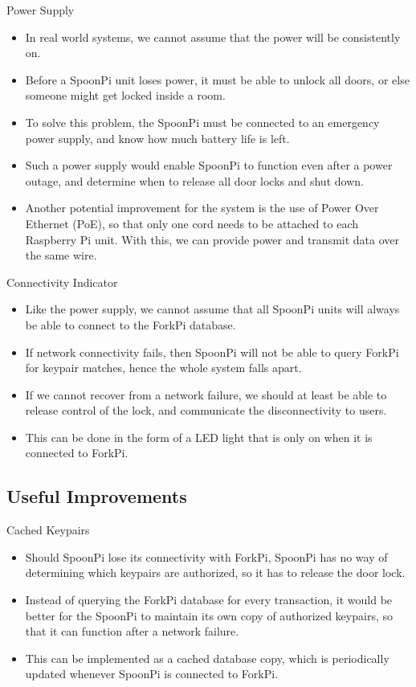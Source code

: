 \begin{frame}{Power Supply}
\begin{itemize}
    \item<1-> In real world systems, we cannot assume that the power will be consistently on.
    \item<2-> Before a SpoonPi unit loses power, it must be able to unlock all doors, or else someone might get locked inside a room.
    \item<3-> To solve this problem, the SpoonPi must be connected to an emergency power supply, and know how much battery life is left.
    \item<4-> Such a power supply would enable SpoonPi to function even after a power outage, and determine when to release all door locks and shut down.
    \item<5-> Another potential improvement for the system is the use of Power Over Ethernet (PoE), so that only one cord needs to be attached to each Raspberry Pi unit. With this, we can provide power and transmit data over the same wire.
\end{itemize}
\end{frame}

\begin{frame}{Connectivity Indicator}
\begin{itemize}
    \item<1-> Like the power supply, we cannot assume that all SpoonPi units will always be able to connect to the ForkPi database.
    \item<2-> If network connectivity fails, then SpoonPi will not be able to query ForkPi for keypair matches, hence the whole system falls apart.
    \item<3-> If we cannot recover from a network failure, we should at least be able to release control of the lock, and communicate the disconnectivity to users.
    \item<4-> This can be done in the form of a LED light that is only on when it is connected to ForkPi.
\end{itemize}
\end{frame}

\subsection{Useful Improvements}
\begin{frame}{Cached Keypairs}
\begin{itemize}
    \item<1-> Should SpoonPi lose its connectivity with ForkPi, SpoonPi has no way of determining which keypairs are authorized, so it has to release the door lock.
    \item<2-> Instead of querying the ForkPi database for every transaction, it would be better for the SpoonPi to maintain its own copy of authorized keypairs, so that it can function after a network failure.
    \item<3-> This can be implemented as a cached database copy, which is periodically updated whenever SpoonPi is connected to ForkPi.
\end{itemize}
\end{frame}

